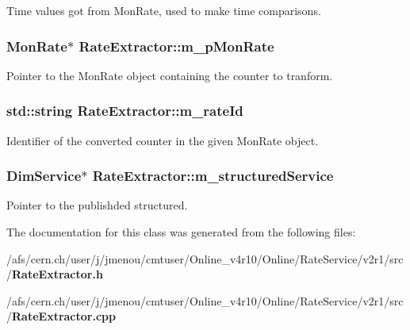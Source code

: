 Time values got from Mon\-Rate, used to make time comparisons. 
\subsubsection{\setlength{\rightskip}{0pt plus 5cm}Mon\-Rate$\ast$ {\bf Rate\-Extractor::m\_\-p\-Mon\-Rate}\hspace{0.3cm}{\tt  [private]}}\label{classRateExtractor_r2}


Pointer to the Mon\-Rate object containing the counter to tranform. 
\subsubsection{\setlength{\rightskip}{0pt plus 5cm}std::string {\bf Rate\-Extractor::m\_\-rate\-Id}\hspace{0.3cm}{\tt  [private]}}\label{classRateExtractor_r1}


Identifier of the converted counter in the given Mon\-Rate object. 
\subsubsection{\setlength{\rightskip}{0pt plus 5cm}Dim\-Service$\ast$ {\bf Rate\-Extractor::m\_\-structured\-Service}\hspace{0.3cm}{\tt  [private]}}\label{classRateExtractor_r0}


Pointer to the publishded structured. 

The documentation for this class was generated from the following files:\begin{CompactItemize}
\item 
/afs/cern.ch/user/j/jmenou/cmtuser/Online\_\-v4r10/Online/Rate\-Service/v2r1/src/{\bf Rate\-Extractor.h}\item 
/afs/cern.ch/user/j/jmenou/cmtuser/Online\_\-v4r10/Online/Rate\-Service/v2r1/src/{\bf Rate\-Extractor.cpp}\end{CompactItemize}
